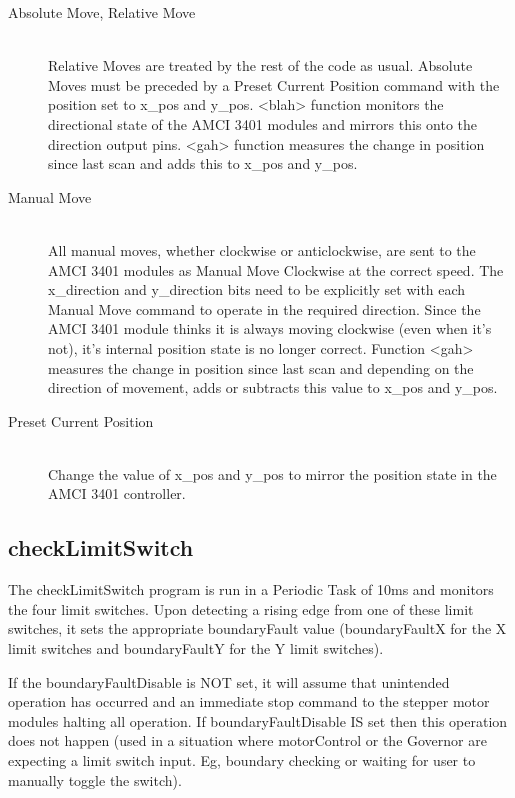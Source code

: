 			\begin{description}
				\item[Absolute Move, Relative Move] \hfill \\
					Relative Moves are treated by the rest of the code as usual. Absolute Moves must be preceded by a Preset Current Position command with the position set to x\_pos and y\_pos. <blah> function monitors the directional state of the AMCI 3401 modules and mirrors this onto the direction output pins. <gah> function measures the change in position since last scan and adds this to x\_pos and y\_pos.
				\item[Manual Move] \hfill \\
					All manual moves, whether clockwise or anticlockwise, are sent to the AMCI 3401 modules as Manual Move Clockwise at the correct speed. The x\_direction and y\_direction bits need to be explicitly set with each Manual Move command to operate in the required direction. Since the AMCI 3401 module thinks it is always moving clockwise (even when it's not), it's internal position state is no longer correct. Function <gah> measures the change in position since last scan and depending on the direction of movement, adds or subtracts this value to x\_pos and y\_pos.
				\item[Preset Current Position] \hfill \\
					Change the value of x\_pos and y\_pos to mirror the position state in the AMCI 3401 controller.
			\end{description}
			

\subsection{checkLimitSwitch}
	The checkLimitSwitch program is run in a Periodic Task of 10ms and monitors the four limit switches. Upon detecting a rising edge from one of these limit switches, it sets the appropriate boundaryFault value (boundaryFaultX for the X limit switches and boundaryFaultY for the Y limit switches).
	
	If the boundaryFaultDisable is NOT set, it will assume that unintended operation has occurred and an immediate stop command to the stepper motor modules halting all operation. If boundaryFaultDisable IS set then this operation does not happen (used in a situation where motorControl or the Governor are expecting a limit switch input. Eg, boundary checking or waiting for user to manually toggle the switch).
